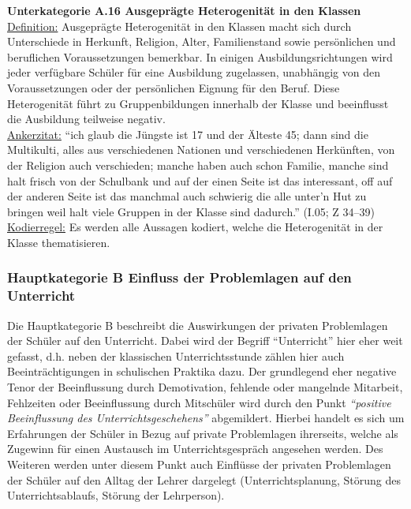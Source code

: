 \textbf{Unterkategorie A.16 Ausgeprägte Heterogenität in den Klassen}\\
\underline{Definition:} Ausgeprägte Heterogenität in den Klassen macht sich durch Unterschiede in Herkunft, Religion, Alter, Familienstand sowie persönlichen und beruflichen Voraussetzungen bemerkbar. In einigen Ausbildungsrichtungen wird jeder verfügbare Schüler für eine Ausbildung zugelassen, unabhängig von den Voraussetzungen oder der persönlichen Eignung für den Beruf. Diese Heterogenität führt zu Gruppenbildungen innerhalb der Klasse und beeinflusst die Ausbildung teilweise negativ.\\
\underline{Ankerzitat:} "`ich glaub die Jüngste ist 17 und der Älteste 45; dann sind die Multikulti, alles aus verschiedenen Nationen und verschiedenen Herkünften, von der Religion auch verschieden; manche haben auch schon Familie, manche sind halt frisch von der Schulbank und auf der einen Seite ist das interessant, off auf der anderen Seite ist das manchmal auch schwierig die alle unter'n Hut zu bringen weil halt viele Gruppen in der Klasse sind dadurch."' (I.05; Z 34--39)\\
\underline{Kodierregel:} Es werden alle Aussagen kodiert, welche die Heterogenität in der Klasse thematisieren.\\

\subsubsection{Hauptkategorie B Einfluss der Problemlagen auf den Unterricht}
\label{sec:HauptkategorieBEinflussDerProblemlagenAufDenUnterricht}

Die Hauptkategorie B beschreibt die Auswirkungen der privaten Problemlagen der Schüler auf den Unterricht. Dabei wird der Begriff "`Unterricht"' hier eher weit gefasst, d.h. neben der klassischen Unterrichtsstunde zählen hier auch Beeinträchtigungen in schulischen Praktika dazu. Der grundlegend eher negative Tenor der Beeinflussung durch Demotivation, fehlende oder mangelnde Mitarbeit, Fehlzeiten oder Beeinflussung durch Mitschüler wird durch den Punkt \textit{"`positive Beeinflussung des Unterrichtsgeschehens"'} abgemildert. Hierbei handelt es sich um Erfahrungen der Schüler in Bezug auf private Problemlagen ihrerseits, welche als Zugewinn für einen Austausch im Unterrichtsgespräch angesehen werden. Des Weiteren werden unter diesem Punkt auch Einflüsse der privaten Problemlagen der Schüler auf den Alltag der Lehrer dargelegt (Unterrichtsplanung, Störung des Unterrichtsablaufs, Störung der Lehrperson).\\

